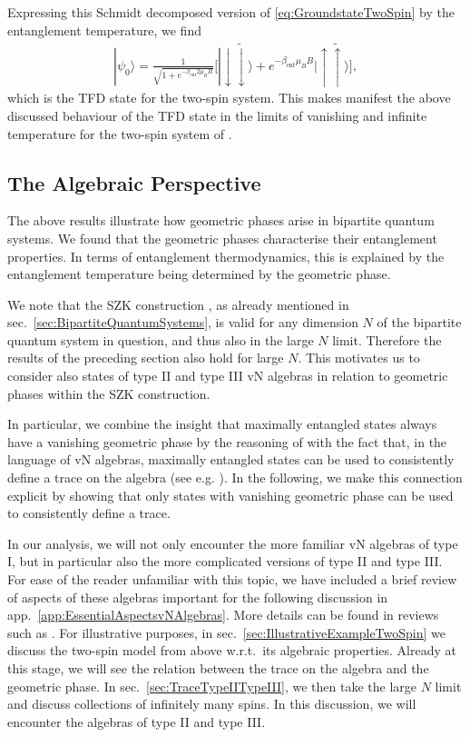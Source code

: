 \documentclass[a4paper,11pt]{article}
\newcommand{\1}{\mathds{1}}
\begin{document}
Expressing this Schmidt decomposed version of \eqref{eq:GroundstateTwoSpin} by the entanglement temperature, we find
\begin{align}
    |\psi_0\rangle=\frac{1}{\sqrt{1+e^{-\beta_{\text{ent}}2\mu_BB}}}\Big[|\!\downarrow\!\tilde{\downarrow}\rangle+e^{-\beta_{\text{ent}}\mu_BB}|\!\uparrow\!\tilde{\uparrow}\rangle\Big],\label{eq:TwoSpinTFD}
\end{align}
which is the TFD state for the two-spin system. This makes manifest the above discussed behaviour of the TFD state in the limits of vanishing and infinite temperature for the two-spin system of \cite{Nogueira:2021ngh}.

\subsection{The Algebraic Perspective}
\label{sec:AlgebraicPerspective}

The above results illustrate how geometric phases arise in bipartite quantum systems. We found that  the geometric phases characterise their entanglement properties. In terms of entanglement thermodynamics, this is explained by the entanglement temperature being determined by the geometric phase. 

We note that the SZK construction \cite{Sinolecka2002manifolds}, as already mentioned in sec.~\ref{sec:BipartiteQuantumSystems}, is valid for any dimension $N$ of the bipartite quantum system in question, and thus also in the large $N$ limit. Therefore the results of the preceding section also hold for large $N$. This motivates us to consider also states of type II and type III vN algebras in relation to geometric phases within the SZK construction.

In particular, we combine the insight that maximally entangled states always have a vanishing geometric phase by the reasoning of \cite{Sinolecka2002manifolds} with the fact that, in the language of vN algebras, maximally entangled states can be used to consistently define a trace on the algebra (see e.g. \cite{Witten:2018zxz}). In the following, we make this connection explicit by showing that only states with vanishing geometric phase can be used to consistently define a trace.

In our analysis, we will not only encounter the more familiar vN algebras of type I, but in particular also the more complicated versions of type II and type III. For ease of the reader unfamiliar with this topic, we have included a brief review of aspects of these algebras important for the following discussion in app.~\ref{app:EssentialAspectsvNAlgebras}. More details can be found in reviews such as \cite{Witten:2018zxz,Witten:2021jzq,Sorce:2023fdx}. For illustrative purposes, in sec.~\ref{sec:IllustrativeExampleTwoSpin} we discuss the two-spin model from above w.r.t.~its algebraic properties. Already at this stage, we will see the relation between the trace on the algebra and the geometric phase. In sec.~\ref{sec:TraceTypeIITypeIII}, we then take the large $N$ limit and discuss collections of infinitely many spins. In this discussion, we will encounter the algebras of type II and type III.
\end{document}
